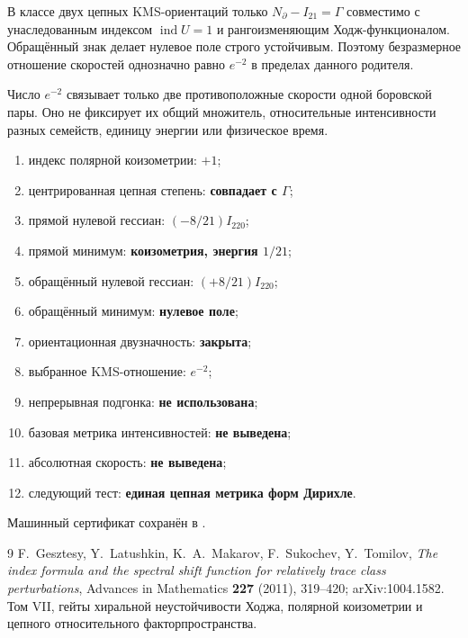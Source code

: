 \begin{theorem}
В классе двух цепных KMS-ориентаций только
$N_{\partial}-I_{21}=\Gamma$ совместимо с унаследованным индексом
$\operatorname{ind}U=1$ и рангоизменяющим Ходж-функционалом. Обращённый
знак делает нулевое поле строго устойчивым. Поэтому безразмерное отношение
скоростей однозначно равно $e^{-2}$ в пределах данного родителя.
\end{theorem}

\begin{nogocriterion}
Число $e^{-2}$ связывает только две противоположные скорости одной
боровской пары. Оно не фиксирует их общий множитель, относительные
интенсивности разных семейств, единицу энергии или физическое время.
\end{nogocriterion}

\begin{protocol}
\begin{enumerate}
 \item индекс полярной коизометрии: \textbf{$+1$};
 \item центрированная цепная степень: \textbf{совпадает с $\Gamma$};
 \item прямой нулевой гессиан: \textbf{$(-8/21)I_{220}$};
 \item прямой минимум: \textbf{коизометрия, энергия $1/21$};
 \item обращённый нулевой гессиан: \textbf{$(+8/21)I_{220}$};
 \item обращённый минимум: \textbf{нулевое поле};
 \item ориентационная двузначность: \textbf{закрыта};
 \item выбранное KMS-отношение: \textbf{$e^{-2}$};
 \item непрерывная подгонка: \textbf{не использована};
 \item базовая метрика интенсивностей: \textbf{не выведена};
 \item абсолютная скорость: \textbf{не выведена};
 \item следующий тест: \textbf{единая цепная метрика форм Дирихле}.
\end{enumerate}
\end{protocol}

Машинный сертификат сохранён в
.

\begin{thebibliography}{9}
F.~Gesztesy, Y.~Latushkin, K.~A.~Makarov, F.~Sukochev, Y.~Tomilov,
\emph{The index formula and the spectral shift function for relatively
trace class perturbations}, Advances in Mathematics \textbf{227} (2011),
319--420; arXiv:1004.1582.
Том VII, гейты хиральной неустойчивости Ходжа, полярной коизометрии и
цепного относительного факторпространства.
\end{thebibliography}